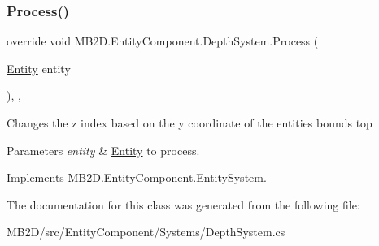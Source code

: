 \subsubsection{\texorpdfstring{Process()}{Process()}}
{\footnotesize\ttfamily override void M\+B2\+D.\+Entity\+Component.\+Depth\+System.\+Process (\begin{DoxyParamCaption}\item[{\hyperlink{class_m_b2_d_1_1_entity_component_1_1_entity}{Entity}}]{entity }\end{DoxyParamCaption})\hspace{0.3cm}{\ttfamily [inline]}, {\ttfamily [protected]}, {\ttfamily [virtual]}}



Changes the z index based on the y coordinate of the entities bounds top 


\begin{DoxyParams}{Parameters}
{\em entity} & \hyperlink{class_m_b2_d_1_1_entity_component_1_1_entity}{Entity} to process.\\
\hline
\end{DoxyParams}


Implements \hyperlink{class_m_b2_d_1_1_entity_component_1_1_entity_system_abbf83b87cb5d12754fb058cef50451fa}{M\+B2\+D.\+Entity\+Component.\+Entity\+System}.



The documentation for this class was generated from the following file\+:\begin{DoxyCompactItemize}
\item 
M\+B2\+D/src/\+Entity\+Component/\+Systems/Depth\+System.\+cs\end{DoxyCompactItemize}
